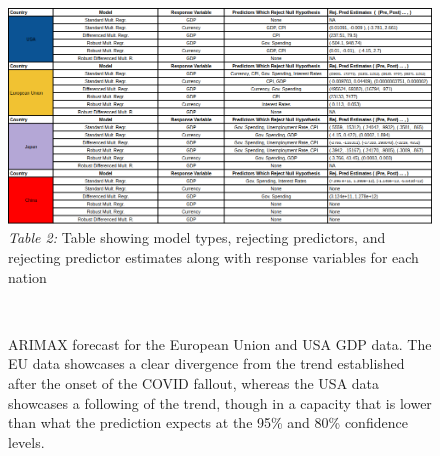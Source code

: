 \documentclass[11pt,regno]{amsart}
\theoremstyle{plain}
\numberwithin{equation}{section}
\begin{document}
\begin{figure}[h!]  
\caption*{\textit{Table 2:} Table showing model types, rejecting predictors, and rejecting predictor estimates along with response variables for each nation}
\includegraphics[scale = 0.5]{pred_rej_table.png} 
\end{figure}





\begin{figure}
\centering
\centerline{ \mbox{
}}
\caption{ ARIMAX forecast for the European Union and USA GDP data. The EU data showcases a clear divergence from the trend established after the onset of the COVID fallout, whereas the USA data showcases a following of the trend, though in a capacity that is lower than what the prediction expects at the 95\% and 80\% confidence levels.}
\end{figure}
\end{document}
